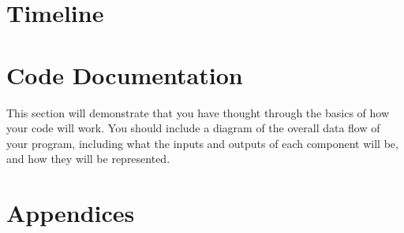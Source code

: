\documentclass[10pt,twocolumn]{article}
\begin{document}
\section{Timeline}


\section{Code Documentation}

This section will demonstrate that you have thought through the basics of how your code will work. You should include a diagram of the overall data flow of your program, including what the inputs and outputs of each component will be, and how they will be represented.

\section{Appendices}

\printbibliography
\end{document}
